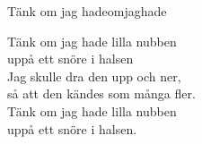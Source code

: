 \begin{song}{Tänk om jag hade}{omjaghade}
\begin{vers}
\repopen Tänk om jag hade lilla nubben\\
uppå ett snöre i halsen \repclose\\
Jag skulle dra den upp och ner,\\
så att den kändes som många fler.\\
Tänk om jag hade lilla nubben\\
uppå ett snöre i halsen.\\
\end{vers}
\end{song}
